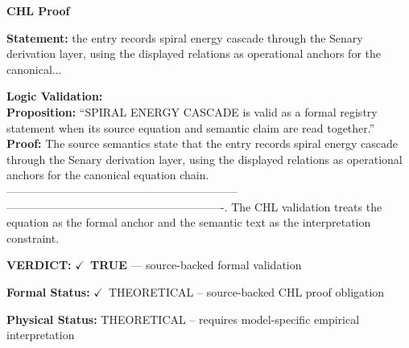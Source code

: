 \vspace{0.45em}
\noindent\textbf{CHL Proof}\par
\textbf{Statement:} the entry records spiral energy cascade through the Senary derivation layer, using the
displayed relations as operational anchors for the canonical...

\textbf{Logic Validation:}\\
\textbf{Proposition:} ``SPIRAL ENERGY CASCADE is valid as a formal registry statement when its source equation
and semantic claim are read together.''\\
\textbf{Proof:} The source semantics state that the entry records spiral energy cascade through the
Senary derivation layer, using the displayed relations as operational anchors for the
canonical equation chain. --------------------------------------------------------------
----------------------------------------------------------. The CHL validation treats
the equation as the formal anchor and the semantic text as the interpretation
constraint.

\textbf{VERDICT:} \ensuremath{\checkmark}\ \textbf{TRUE} --- source-backed formal validation

\textbf{Formal Status:} \ensuremath{\checkmark}\ THEORETICAL -- source-backed CHL proof obligation

\textbf{Physical Status:} THEORETICAL -- requires model-specific empirical interpretation
\par\vspace{0.45em}
\par
\ifTZPDarkEdition
{}
\fi
\endgroup
\endgroup
